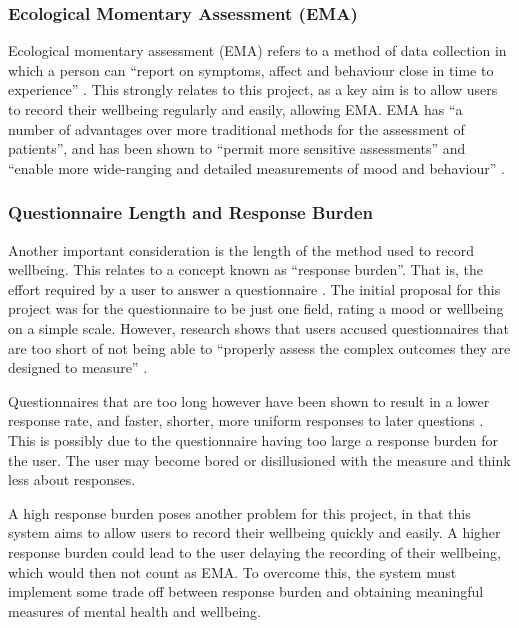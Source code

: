\documentclass[11pt,openright,a4paper]{report}
\begin{document}
\subsubsection{Ecological Momentary Assessment (EMA)} \label{sec:ema}
Ecological momentary assessment (EMA) refers to a method of data collection in which a person can \enquote{report on symptoms, affect and behaviour close in time to experience} \parencite{moskowitz2006ecological}. This strongly relates to this project, as a key aim is to allow users to record their wellbeing regularly and easily, allowing EMA. EMA has \enquote{a number of advantages over more traditional methods for the assessment of patients}, and has been shown to \enquote{permit more sensitive assessments} and \enquote{enable more wide-ranging and detailed measurements of mood and behaviour} \parencite{moskowitz2006ecological}.

\subsubsection{Questionnaire Length and Response Burden} \label{questionnairelength}
Another important consideration is the length of the method used to record wellbeing. This relates to a concept known as \enquote{response burden}. That is, the effort required by a user to answer a questionnaire \parencite{rolstad2011response}. The initial proposal for this project was for the questionnaire to be just one field, rating a mood or wellbeing on a simple scale. However, research shows that users accused questionnaires that are too short of not being able to \enquote{properly assess the complex
outcomes they are designed to measure} \parencite{crawford2011selecting}.

Questionnaires that are too long however have been shown to result in a lower response rate, and faster, shorter, more uniform responses to later questions \parencite{galesic2009effects}. This is possibly due to the questionnaire having too large a response burden for the user. The user may become bored or disillusioned with the measure and think less about responses.

A high response burden poses another problem for this project, in that this system aims to allow users to record their wellbeing quickly and easily. A higher response burden could lead to the user delaying the recording of their wellbeing, which would then not count as EMA. To overcome this, the system must implement some trade off between response burden and obtaining meaningful measures of mental health and wellbeing.
\end{document}
